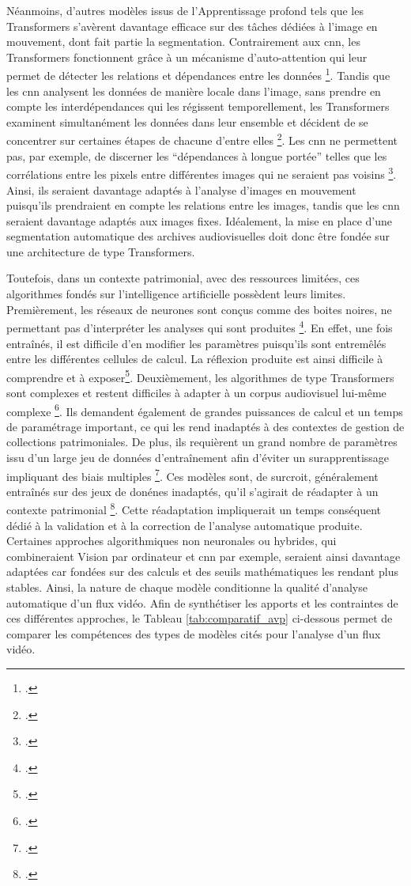 Néanmoins, d’autres modèles issus de l'\gls{Apprentissage profond} tels que les \gls{Transformers} s’avèrent davantage efficace sur des tâches dédiées à l’image en mouvement, dont fait partie la segmentation. Contrairement aux \gls{cnn}, les \gls{Transformers} fonctionnent grâce à un mécanisme d’auto-attention qui leur permet de détecter les relations et dépendances entre les données \footcite{bergmann2025}. Tandis que les \gls{cnn} analysent les données de manière locale dans l'image, sans prendre en compte les interdépendances qui les régissent temporellement, les \gls{Transformers} examinent simultanément les données dans leur ensemble et décident de se concentrer sur certaines étapes de chacune d'entre elles \footcite{bergmann2025}. Les \gls{cnn} ne permettent pas, par exemple, de discerner les “dépendances à longue portée” telles que les corrélations entre les pixels entre différentes images qui ne seraient pas voisins \footcite{bergmann2025}. Ainsi, ils seraient davantage adaptés à l’analyse d’images en mouvement puisqu’ils prendraient en compte les relations entre les images, tandis que les \gls{cnn} seraient davantage adaptés aux images fixes.  Idéalement, la mise en place d’une segmentation automatique des archives audiovisuelles doit donc être fondée sur une architecture de type \gls{Transformers}.  

Toutefois, dans un contexte patrimonial, avec des ressources limitées, ces algorithmes fondés sur l’intelligence artificielle possèdent leurs limites. Premièrement, les réseaux de neurones sont conçus comme des boites noires, ne permettant pas d’interpréter les analyses qui sont produites \footcite{brachmann2017}. En effet, une fois entraînés, il est difficile d’en modifier les paramètres puisqu’ils sont entremêlés entre les différentes cellules de calcul. La réflexion produite est ainsi difficile à comprendre et à exposer\footcite{mahony2020}. Deuxièmement, les algorithmes de type \gls{Transformers} sont complexes et restent difficiles à adapter à un corpus audiovisuel lui-même complexe  \footcite{yuan2025}. Ils demandent également de grandes puissances de calcul et un temps de paramétrage important, ce qui les rend inadaptés à des contextes de gestion de collections patrimoniales. De plus, ils requièrent un grand nombre de paramètres issu d’un large jeu de données d’entraînement afin d’éviter un surapprentissage impliquant des biais multiples \footcite{pattichis2023}. Ces modèles sont, de surcroit, généralement entraînés sur des jeux de donénes inadaptés, qu'il s'agirait de réadapter à un contexte patrimonial \footcite{pattichis2023}. Cette réadaptation impliquerait un temps conséquent dédié à la validation et à la correction de l'analyse automatique produite. Certaines approches algorithmiques non neuronales ou hybrides, qui combineraient \gls{Vision par ordinateur} et \gls{cnn} par exemple, seraient ainsi davantage adaptées car fondées sur des calculs et des seuils mathématiques les rendant plus stables. 
Ainsi, la nature de chaque modèle conditionne la qualité d'analyse automatique d'un flux vidéo. Afin de synthétiser les apports et les contraintes de ces différentes approches, le Tableau \ref{tab:comparatif_avp} ci-dessous permet de comparer les compétences des types de modèles cités pour l'analyse d'un flux vidéo. 


